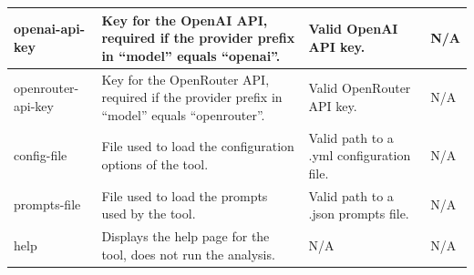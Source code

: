 \begin{longtable}[hp]{|p{2cm}|p{5cm}|p{4cm}|p{2.5cm}|}
    openai-api-key & Key for the OpenAI API, required if the provider prefix in “model” equals “openai”. & Valid OpenAI API key. & N/A \\ \hline
    openrouter-api-key & Key for the OpenRouter API, required if the provider prefix in “model” equals “openrouter”. & Valid OpenRouter API key. & N/A \\ \hline
    config-file & File used to load the configuration options of the tool. & Valid path to a .yml configuration file. & N/A \\ \hline
    prompts-file & File used to load the prompts used by the tool. & Valid path to a .json prompts file. & N/A \\ \hline
    help & Displays the help page for the tool, does not run the analysis. & N/A & N/A \\
\end{longtable}
